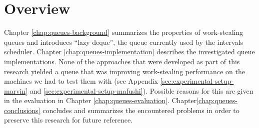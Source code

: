 \section{Overview}
\label{sec:queues-intro-overview}

Chapter \ref{chap:queues-background} summarizes the properties of
work-stealing queues and introduces ``lazy deque'', the queue
currently used by the intervals scheduler. Chapter
\ref{chap:queues-implementation} describes the investigated queue
implementations. None of the approaches that were developed as part of
this research yielded a queue that was improving work-stealing
performance on the machines we had to test them with (see Appendix
\ref{sec:experimental-setup-marvin} and
\ref{sec:experimental-setup-mafushi}). Possible reasons for this are
given in the evaluation in Chapter
\ref{chap:queues-evaluation}. Chapter\ref{chap:queues-conclusions}
concludes and summarizes the encountered problems in order to preserve
this research for future reference.



